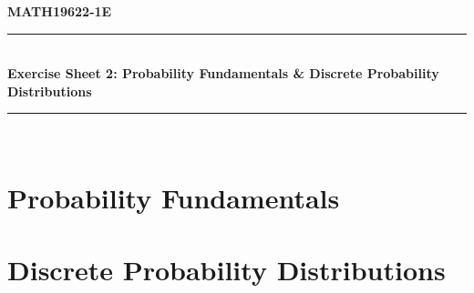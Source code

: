 \documentclass[11pt, a4paper]{article}
\begin{document}
\begin{center}
    \textbf{\large MATH19622-1E} \\
    \vspace{0.2cm}
    \rule{0.8\textwidth}{0.4pt} \\
    \vspace{0.4cm}
    \textbf{\Large Exercise Sheet 2: Probability Fundamentals \& Discrete Probability Distributions } \\
    \vspace{0.4cm}
    \rule{0.8\textwidth}{0.4pt} \\
\end{center}
\vspace{0.6cm}

\section{ Probability Fundamentals}

\section{Discrete Probability Distributions}

\end{document}
